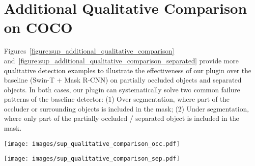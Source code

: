 \documentclass{bmvc2k}
\begin{document}
\section{Additional Qualitative Comparison on COCO}
\label{sec:sup_additional_qualitative_comparison}
Figures~\ref{figure:sup_additional_qualitative_comparison} and~\ref{figure:sup_additional_qualitative_comparison_separated} provide more qualitative detection examples to illustrate the effectiveness of our plugin over the baseline (Swin-T + Mask R-CNN) on partially occluded objects and separated objects. In both cases, our plugin can systematically solve two common failure patterns of the baseline detector: (1) Over segmentation, where part of the occluder or surrounding objects is included in the mask; (2) Under segmentation, where only part of the partially occluded / separated object is included in the mask.


\begin{figure*}[h!]
		\centering
		\texttt{[image: images/sup\_qualitative\_comparison\_occ.pdf]}
		\caption{\color{bmvc_blue} \textbf{Additional qualitative comparison of our model with baseline on Occluded COCO.} Our model can systematically solve the common failure patterns of over-segmentation (the mask is too large, and includes part of occluder) (Row 1-3) and under-segmentation (the mask is too small) (Row 4-6) for partially occluded objects. 
  }
\label{figure:sup_additional_qualitative_comparison}
 		\vspace{-1.5mm}
\end{figure*}


\clearpage

\begin{figure*}[h!]
		\centering
		\texttt{[image: images/sup\_qualitative\_comparison\_sep.pdf]}
		\caption{\color{bmvc_blue} \textbf{Additional qualitative comparison of our model with baseline on Separated COCO.} Our model could systematically solve the failure patterns of under-segmentation (the mask is too small, and only includes part of the separated object) (Row 1-4) and over-segmentation (the mask is too large, and also includes part of the occluder or surrounding objects) (Row 5-6) for separated objects. 
  }
\label{figure:sup_additional_qualitative_comparison_separated}
 		\vspace{-1.5mm}
\end{figure*}

\clearpage
\end{document}
